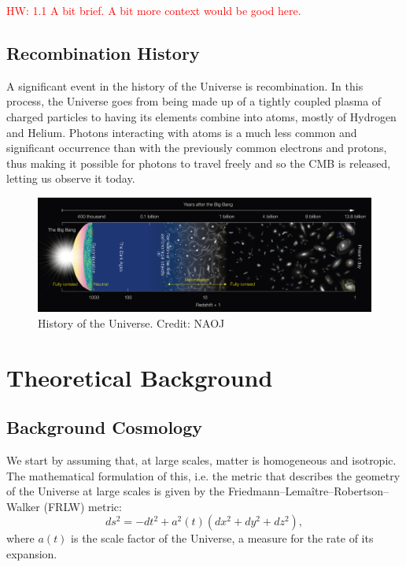 \documentclass{aa}
\newcommand{\hw}[1]{\textcolor{red}{HW: #1}}
\begin{document}
\hw{1.1 A bit brief. A bit more context would be good here.}

\subsection{Recombination History}

A significant event in the history of the Universe is recombination. In this process, the Universe goes from being made up of a tightly coupled plasma of charged particles to having its elements combine into atoms, mostly of Hydrogen and Helium. Photons interacting with atoms is a much less common and significant occurrence than with the previously common electrons and protons, thus making it possible for photons to travel freely and so the CMB is released, letting us observe it today.

\begin{figure}[ht]
\caption{History of the Universe. Credit: NAOJ}             
\label{fig:history}      
\centering          
\includegraphics[width=\textwidth]{report/figures/eso1620a.jpg}
\end{figure}

\section{Theoretical Background}

\subsection{Background Cosmology}

We start by assuming that, at large scales, matter is homogeneous and isotropic. The mathematical formulation of this, i.e. the metric that describes the geometry of the Universe at large scales is given by the Friedmann–Lemaître–Robertson–Walker (FRLW) metric:
\begin{equation}
ds^2 = -dt^2 + a^2(t)(dx^2 + dy^2 + dz^2),
\end{equation}
where $a(t)$ is the scale factor of the Universe, a measure for the rate of its expansion.
\end{document}
